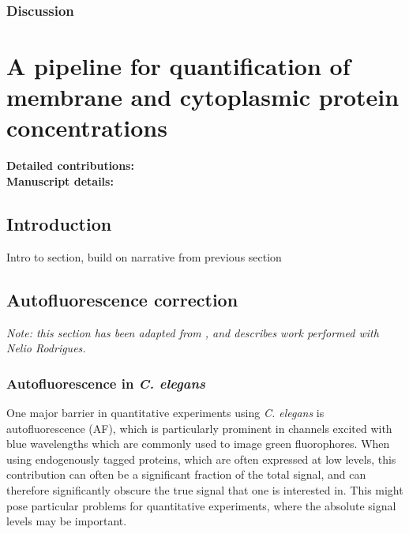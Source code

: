 \documentclass[12pt]{"report"}
\begin{document}
\subsection{Discussion}

\clearpage
\chapter{A pipeline for quantification of membrane and cytoplasmic protein concentrations}

\textbf{Detailed contributions:}\\

\textbf{Manuscript details:}

\clearpage
\section{Introduction}

Intro to section, build on narrative from previous section

\clearpage
\section{Autofluorescence correction}

\textit{Note: this section has been adapted from \textcite{Rodrigues2022}, and describes work performed with Nelio Rodrigues.}

\subsection{Autofluorescence in \textit{C. elegans}}

One major barrier in quantitative experiments using \textit{C. elegans} is autofluorescence (AF), which is particularly prominent in channels excited with blue wavelengths which are commonly used to image green fluorophores. When using endogenously tagged proteins, which are often expressed at low levels, this contribution can often be a significant fraction of the total signal, and can therefore significantly obscure the true signal that one is interested in. This might pose particular problems for quantitative experiments, where the absolute signal levels may be important.\\
\end{document}
